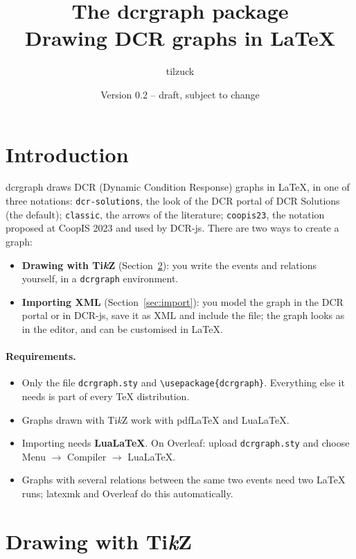 \documentclass[a4paper,11pt]{article}
\title{The \textsf{dcrgraph} package\\[4pt]
  \large Drawing DCR graphs in \LaTeX}
\author{tilzuck}
\date{Version 0.2 -- draft, subject to change}
\newcommand\cs[1]{\texttt{\textbackslash#1}}
\begin{document}
\maketitle
\tableofcontents

\section{Introduction}

\textsf{dcrgraph} draws DCR (Dynamic Condition Response) graphs in
\LaTeX, in one of three notations: \texttt{dcr-solutions}, the look of the
DCR portal of DCR Solutions (the default); \texttt{classic}, the arrows of the
literature; \texttt{coopis23}, the notation proposed at CoopIS 2023 and used
by DCR-js. There are two ways to create a graph:
\begin{itemize}
  \item \textbf{Drawing with Ti\emph{k}Z} (Section~\ref{sec:tikz}): you write
    the events and relations yourself, in a \texttt{dcrgraph} environment.
  \item \textbf{Importing XML} (Section~\ref{sec:import}): you model the graph
    in the DCR portal or in DCR-js, save it as XML and include the file;
    the graph looks as in the editor, and can be customised in \LaTeX.
\end{itemize}

\paragraph{Requirements.}
\begin{itemize}
  \item Only the file \texttt{dcrgraph.sty} and \cs{usepackage\{dcrgraph\}}.
    Everything else it needs is part of every \TeX{} distribution.
  \item Graphs drawn with Ti\emph{k}Z work with pdf\LaTeX{} and Lua\LaTeX.
  \item Importing needs \textbf{Lua\LaTeX}. On Overleaf: upload
    \texttt{dcrgraph.sty} and choose Menu $\to$ Compiler $\to$ LuaLaTeX.
  \item Graphs with several relations between the same two events need two
    \LaTeX{} runs; latexmk and Overleaf do this automatically.
\end{itemize}

\section{\texorpdfstring{Drawing with Ti\emph{k}Z}{Drawing with TikZ}}\label{sec:tikz}
\end{document}
